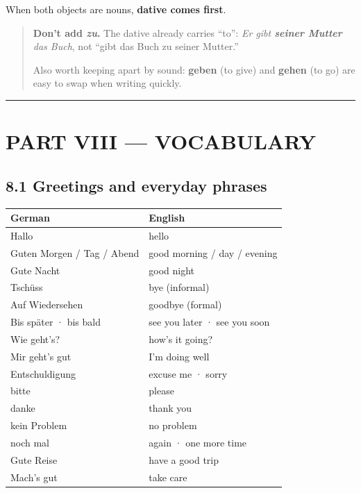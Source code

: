 \documentclass[
  11pt,
]{article}
\newcounter{none} %
\begin{document}
When both objects are nouns, \textbf{dative comes first}.

\begin{quote}
\textbf{Don't add \emph{zu}.} The dative already carries ``to'':
\emph{Er gibt \textbf{seiner Mutter} das Buch}, not ``gibt das Buch zu
seiner Mutter.''

Also worth keeping apart by sound: \textbf{geben} (to give) and
\textbf{gehen} (to go) are easy to swap when writing quickly.
\end{quote}

\begin{center}\rule{0.5\linewidth}{0.5pt}\end{center}

\section{PART VIII --- VOCABULARY}\label{part-viii-vocabulary}

\subsection{8.1 Greetings and everyday
phrases}\label{greetings-and-everyday-phrases}

{\def\LTcaptype{none} %
\begin{longtable}[]{@{}ll@{}}
\toprule\noalign{}
German & English \\
\midrule\noalign{}
\endhead
\bottomrule\noalign{}
\endlastfoot
Hallo & hello \\
Guten Morgen / Tag / Abend & good morning / day / evening \\
Gute Nacht & good night \\
Tschüss & bye (informal) \\
Auf Wiedersehen & goodbye (formal) \\
Bis später · bis bald & see you later · see you soon \\
Wie geht's? & how's it going? \\
Mir geht's gut & I'm doing well \\
Entschuldigung & excuse me · sorry \\
bitte & please \\
danke & thank you \\
kein Problem & no problem \\
noch mal & again · one more time \\
Gute Reise & have a good trip \\
Mach's gut & take care \\
\end{longtable}
}
\end{document}
